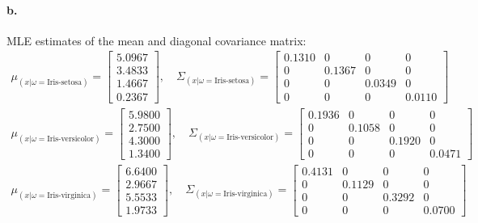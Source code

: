 \documentclass[a4paper]{article}
\begin{document}
\paragraph{b.} MLE estimates of the mean and diagonal covariance matrix: \\
\begin{align*}
	\mu_{(x|\omega=\text{Iris-setosa})} = \begin{bmatrix}
		5.0967 \\
    	3.4833 \\
    	1.4667 \\
    	0.2367
	\end{bmatrix}, \quad
	\Sigma_{(x|\omega=\text{Iris-setosa})} = \begin{bmatrix}
	0.1310  &       0  &       0  &       0\\
         0  &  0.1367  &       0  &       0\\
         0  &       0  &  0.0349  &       0\\
         0  &       0  &       0  &  0.0110
	\end{bmatrix}
\end{align*}
\begin{align*}
	\mu_{(x|\omega=\text{Iris-versicolor})} = \begin{bmatrix}
		5.9800\\
	    2.7500\\
    	4.3000\\
	    1.3400
	\end{bmatrix}, \quad
	\Sigma_{(x|\omega=\text{Iris-versicolor})} = \begin{bmatrix}
	0.1936  &       0  &       0  &       0\\
         0  &  0.1058  &       0  &       0\\
         0  &       0  &  0.1920  &       0\\
         0  &       0  &       0  &  0.0471
	\end{bmatrix}
\end{align*}
\begin{align*}
	\mu_{(x|\omega=\text{Iris-virginica})} = \begin{bmatrix}
		6.6400\\
	    2.9667\\
	    5.5533\\
	    1.9733
	\end{bmatrix}, \quad
	\Sigma_{(x|\omega=\text{Iris-virginica})} = \begin{bmatrix}
	0.4131  &       0  &       0  &       0\\
         0  &  0.1129  &       0  &       0\\
         0  &       0  &  0.3292  &       0\\
         0  &       0  &       0  &  0.0700
	\end{bmatrix}
\end{align*}
\end{document}
